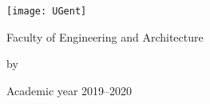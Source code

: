 
\begin{titlepage}

\fontsize{12pt}{14pt}
\selectfont

\begin{center}

\texttt{[image: UGent]}

\vspace{0.5cm}

Faculty of Engineering and Architecture

\vspace{4.0cm}

\fontsize{17.28pt}{21pt}
\selectfont

\thetitle

\fontsize{12pt}{14pt}
\selectfont

\vspace{.3cm}

by

\vspace{.6cm}

\theauthor

\vspace{4.5cm}

Academic year 2019--2020

\end{center}
\end{titlepage}

\newpage\thispagestyle{empty}\mbox{}
